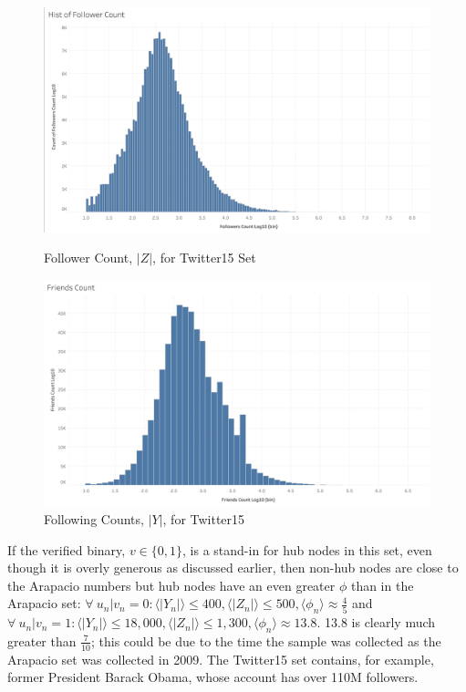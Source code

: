 \documentclass[preprint,review,12pt]{elsarticle}
\begin{document}
 \begin{figure}[h]
  \includegraphics[width=\linewidth]{Twitter15 Follower Count.png}
  \caption{Follower Count, $|Z|$, for Twitter15 Set}\label{fig:Twitter15 Follower}
\endminipage\hfill
{}
  \includegraphics[width=\linewidth]{Twitter15 FriendsCount.png}
  \caption{Following Counts, $|Y|$, for Twitter15}\label{fig:Twitter15 Following}
\endminipage\hfill
\end{figure}



If the verified binary, $v \in \{0,1\}$, is a stand-in for hub nodes in this set, even though it is overly generous as discussed earlier, then non-hub nodes are close to the Arapacio numbers but hub nodes have an even greater $\phi$ than in the Arapacio set: $\forall \ u_n| v_n = 0:\langle |Y_n| \rangle \leq 400, \langle |Z_n| \rangle \leq 500, \langle  \phi_n \rangle \approx \frac{4}{5}$ and $\forall \ u_n| v_n = 1:\langle |Y_n| \rangle \leq 18,000, \langle |Z_n| \rangle \leq 1,300, \langle  \phi_n \rangle \approx 13.8$. 13.8 is clearly much greater than $\frac{7}{10}$; this could be due to the time the sample was collected as the Arapacio set was collected in 2009. The Twitter15 set contains, for example, former President Barack Obama, whose account has over 110M followers. 
\end{document}

